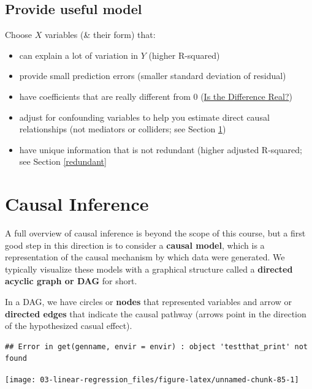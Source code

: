 \documentclass[
]{book}
\providecommand{\tightlist}{%
  \setlength{\itemsep}{0pt}\setlength{\parskip}{0pt}}
\begin{document}
\hypertarget{provide-useful-model}{%
\subsection{Provide useful model}\label{provide-useful-model}}

Choose \(X\) variables (\& their form) that:

\begin{itemize}
\tightlist
\item
  can explain a lot of variation in \(Y\) (higher R-squared)
\item
  provide small prediction errors (smaller standard deviation of residual)
\item
  have coefficients that are really different from 0 (\protect\hyperlink{is-the-difference-real}{Is the Difference Real?})
\item
  adjust for confounding variables to help you estimate direct causal relationships (not mediators or colliders; see Section \ref{dag})
\item
  have unique information that is not redundant (higher adjusted R-squared; see Section \ref{redundant}
\end{itemize}

\hypertarget{dag}{%
\section{Causal Inference}\label{dag}}

A full overview of causal inference is beyond the scope of this course, but a first good step in this direction is to consider a \textbf{causal model}, which is a representation of the causal mechanism by which data were generated. We typically visualize these models with a graphical structure called a \textbf{directed acyclic graph or DAG} for short.

In a DAG, we have circles or \textbf{nodes} that represented variables and arrow or \textbf{directed edges} that indicate the causal pathway (arrows point in the direction of the hypothesized casual effect).

\begin{verbatim}
## Error in get(genname, envir = envir) : object 'testthat_print' not found
\end{verbatim}

\begin{center}\texttt{[image: 03-linear-regression\_files/figure-latex/unnamed-chunk-85-1]} \end{center}
\end{document}
